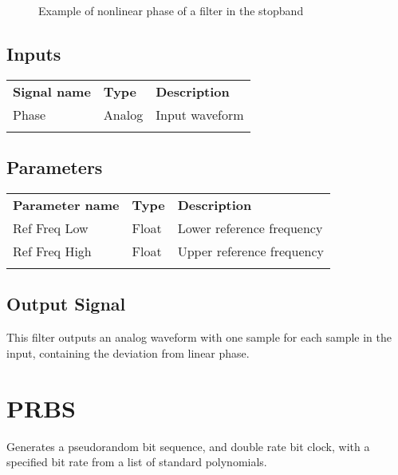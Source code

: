 \begin{figure}[h]
\centering
{}
\caption{Example of nonlinear phase of a filter in the stopband}
\label{phase_nonlinearity_example}
\end{figure}

\subsection{Inputs}

\begin{tabularx}{16cm}{llX}
\thickhline
\textbf{Signal name} & \textbf{Type} & \textbf{Description} \\
\thickhline
Phase & Analog & Input waveform \\
\thickhline
\end{tabularx}

\subsection{Parameters}

\begin{tabularx}{16cm}{llX}
\thickhline
\textbf{Parameter name} & \textbf{Type} & \textbf{Description} \\
\thickhline
Ref Freq Low & Float & Lower reference frequency\\
\thinhline
Ref Freq High & Float & Upper reference frequency\\
\thickhline
\end{tabularx}

\subsection{Output Signal}

This filter outputs an analog waveform with one sample for each sample in the input, containing the deviation from
linear phase.

\pagebreak
\section{PRBS}

Generates a pseudorandom bit sequence, and double rate bit clock, with a specified bit rate from a list of standard
polynomials.

\pagebreak
